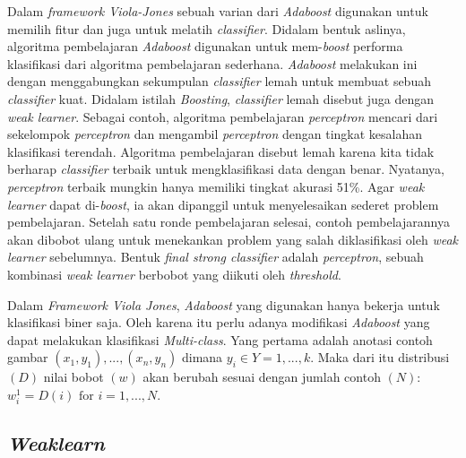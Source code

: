 Dalam \emph{framework Viola-Jones} sebuah varian dari \emph{Adaboost} 
digunakan untuk memilih fitur dan juga untuk melatih \textit{classifier}. 
Didalam bentuk aslinya, algoritma pembelajaran \emph{Adaboost} digunakan 
untuk mem-\textit{boost} performa klasifikasi dari algoritma pembelajaran 
sederhana. \emph{Adaboost} melakukan ini dengan menggabungkan sekumpulan 
\emph{classifier} lemah untuk membuat sebuah \emph{classifier} kuat. 
Didalam istilah \emph{Boosting}, \emph{classifier} lemah disebut juga 
dengan \emph{weak learner}. Sebagai contoh, algoritma pembelajaran \emph{perceptron} 
mencari dari sekelompok \emph{perceptron} dan mengambil \emph{perceptron} 
dengan tingkat kesalahan klasifikasi terendah. Algoritma pembelajaran disebut 
lemah karena kita tidak berharap \emph{classifier} terbaik untuk mengklasifikasi 
data dengan benar. Nyatanya, \emph{perceptron} terbaik mungkin 
hanya memiliki tingkat akurasi 51\%. Agar \emph{weak learner} dapat di-\textit{boost}, 
ia akan dipanggil untuk menyelesaikan sederet problem pembelajaran. Setelah 
satu ronde pembelajaran selesai, contoh pembelajarannya akan dibobot ulang 
untuk menekankan problem yang salah diklasifikasi oleh \emph{weak learner} 
sebelumnya. Bentuk \emph{final strong classifier} adalah \emph{perceptron}, 
sebuah kombinasi \emph{weak learner} berbobot yang diikuti oleh \emph{threshold}.

Dalam \emph{Framework Viola Jones}, \emph{Adaboost} yang digunakan hanya bekerja untuk 
klasifikasi biner saja. Oleh karena itu perlu adanya modifikasi \emph{Adaboost} yang 
dapat melakukan klasifikasi \emph{Multi-class}. Yang pertama adalah anotasi 
contoh gambar $(x_1, y_1),...,(x_n, y_n)$ dimana $y_i \in Y = {1,...,k}$. 
Maka dari itu distribusi $(D)$ nilai bobot $(w)$ akan berubah sesuai dengan 
jumlah contoh $(N)$: $w^1_i = D(i) \text{ for } i=1,...,N$. %

\subsection{\emph{Weaklearn}}


